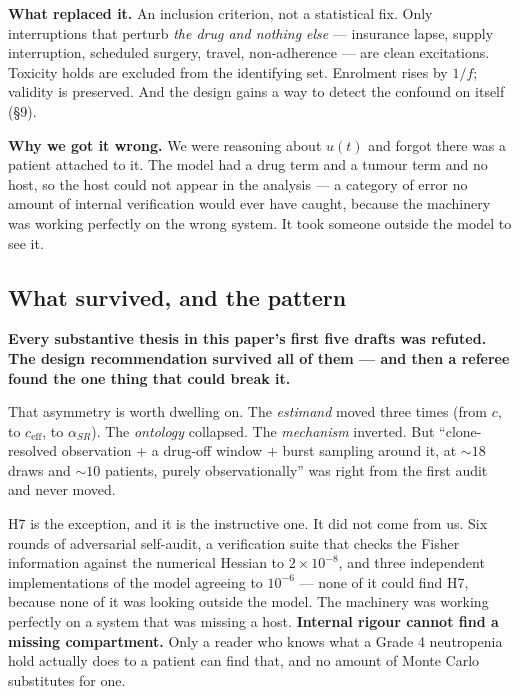 \documentclass[11pt,a4paper]{article}
\newcommand{\ceff}{c_{\mathrm{eff}}}
\newcommand{\aSR}{\alpha_{SR}}
\begin{document}
\textbf{What replaced it.} An inclusion criterion, not a statistical fix. Only
interruptions that perturb \emph{the drug and nothing else} --- insurance lapse, supply
interruption, scheduled surgery, travel, non-adherence --- are clean excitations.
Toxicity holds are excluded from the identifying set. Enrolment rises by $1/f$; validity
is preserved. And the design gains a way to detect the confound on itself (\S9).

\textbf{Why we got it wrong.} We were reasoning about $u(t)$ and forgot there was a
patient attached to it. The model had a drug term and a tumour term and no host, so the
host could not appear in the analysis --- a category of error no amount of internal
verification would ever have caught, because the machinery was working perfectly on the
wrong system. It took someone outside the model to see it.

\subsection{What survived, and the pattern}

\begin{tcolorbox}[keybox]
\textbf{Every substantive thesis in this paper's first five drafts was refuted. The
design recommendation survived all of them --- and then a referee found the one thing
that could break it.}
\end{tcolorbox}

That asymmetry is worth dwelling on. The \emph{estimand} moved three times (from $c$, to
$\ceff$, to $\aSR$). The \emph{ontology} collapsed. The \emph{mechanism} inverted. But
``clone-resolved observation $+$ a drug-off window $+$ burst sampling around it, at
${\sim}18$ draws and ${\sim}10$ patients, purely observationally'' was right from the
first audit and never moved.

H7 is the exception, and it is the instructive one. It did not come from us. Six
rounds of adversarial self-audit, a verification suite that checks the Fisher
information against the numerical Hessian to $2\times10^{-8}$, and three independent
implementations of the model agreeing to $10^{-6}$ --- none of it could find H7,
because none of it was looking outside the model. The machinery was working perfectly
on a system that was missing a host. \textbf{Internal rigour cannot find a missing
compartment.} Only a reader who knows what a Grade 4 neutropenia hold actually does to
a patient can find that, and no amount of Monte Carlo substitutes for one.
\end{document}
